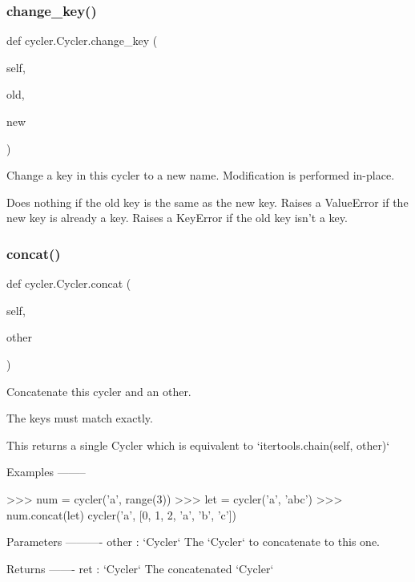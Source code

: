 \subsubsection{\texorpdfstring{change\+\_\+key()}{change\_key()}}
{\footnotesize\ttfamily def cycler.\+Cycler.\+change\+\_\+key (\begin{DoxyParamCaption}\item[{}]{self,  }\item[{}]{old,  }\item[{}]{new }\end{DoxyParamCaption})}

\begin{DoxyVerb}Change a key in this cycler to a new name.
Modification is performed in-place.

Does nothing if the old key is the same as the new key.
Raises a ValueError if the new key is already a key.
Raises a KeyError if the old key isn't a key.\end{DoxyVerb}
 \mbox{\label{classcycler_1_1Cycler_a29be128842304da3f9cf41b526c6e2fe}} 
\subsubsection{\texorpdfstring{concat()}{concat()}}
{\footnotesize\ttfamily def cycler.\+Cycler.\+concat (\begin{DoxyParamCaption}\item[{}]{self,  }\item[{}]{other }\end{DoxyParamCaption})}

\begin{DoxyVerb}Concatenate this cycler and an other.

The keys must match exactly.

This returns a single Cycler which is equivalent to
`itertools.chain(self, other)`

Examples
--------

>>> num = cycler('a', range(3))
>>> let = cycler('a', 'abc')
>>> num.concat(let)
cycler('a', [0, 1, 2, 'a', 'b', 'c'])

Parameters
----------
other : `Cycler`
    The `Cycler` to concatenate to this one.

Returns
-------
ret : `Cycler`
    The concatenated `Cycler`
\end{DoxyVerb}
 \mbox{\label{classcycler_1_1Cycler_a88a3fb0b715e947bfc1c95ce83cac267}} 
